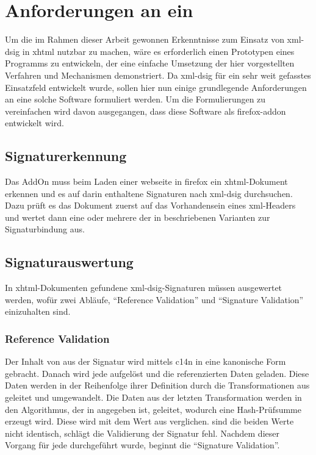 
\chapter{Anforderungen an ein \protect{}}
\label{chap:Anforderungen}
Um die im Rahmen dieser Arbeit gewonnen Erkenntnisse zum Einsatz von \gls{xml-dsig} in \gls{xhtml} nutzbar zu machen, wäre es erforderlich einen Prototypen
eines Programms zu entwickeln, der eine einfache Umsetzung der hier vorgestellten Verfahren und Mechanismen demonstriert. Da \gls{xml-dsig} für ein sehr weit
gefasstes Einsatzfeld entwickelt wurde, sollen hier nun einige grundlegende Anforderungen an eine solche Software formuliert werden. Um die Formulierungen zu
vereinfachen wird davon ausgegangen, dass diese Software als \gls{firefox-addon} entwickelt wird.

\section{Signaturerkennung}
\label{sec:Anforderungen:Signaturerkennung}
Das AddOn muss beim Laden einer \gls{webseite} in \gls{firefox} ein \gls{xhtml}-Dokument erkennen und es auf darin enthaltene Signaturen nach \gls{xml-dsig}
durchsuchen. Dazu prüft es das Dokument zuerst auf das Vorhandensein eines \gls{xml}-Headers und wertet dann eine oder mehrere der in
 beschriebenen Varianten zur Signaturbindung aus.

\section{Signaturauswertung}
\label{sec:Anforderungen:Signaturauswertung}
In \gls{xhtml}-Dokumenten gefundene \gls{xml-dsig}-Signaturen müssen ausgewertet werden, wofür zwei Abläufe, "`Reference Validation"' und "`Signature
Validation"' einizuhalten sind.

\subsection{Reference Validation}
Der Inhalt von  aus der Signatur wird mittels \gls{c14n} in eine kanonische Form gebracht. Danach wird jede  aufgelöst
und die referenzierten Daten geladen. Diese Daten werden in der Reihenfolge ihrer Definition durch die Transformationen aus  geleitet und
umgewandelt. Die Daten aus der letzten Transformation werden in den Algorithmus, der in  angegeben ist, geleitet, wodurch eine
Hash-Prüfsumme erzeugt wird. Diese wird mit dem Wert aus  verglichen. sind die beiden Werte nicht identisch, schlägt die Validierung der
Signatur fehl. Nachdem dieser Vorgang für jede  durchgeführt wurde, beginnt die "`Signature Validation"'.

